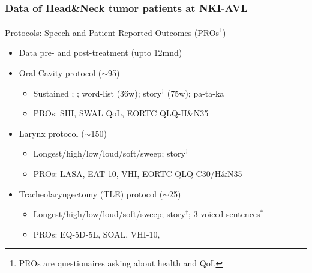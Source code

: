 \documentclass[xcolor=dvipsnames]{beamer}
\begin{document}
\begin{frame}
	\frametitle{Data of Head\&Neck tumor patients at NKI-AVL}
	
	\begin{block}{Protocols: Speech and Patient Reported Outcomes (PROs\footnote[frame]{PROs are questionaires asking about health and QoL})}
	\begin{itemize}
	\item Data pre- and post-treatment (upto 12mnd)
	\item Oral Cavity protocol ($\sim$95)
		\begin{itemize}
		\item Sustained ; ;  word-list (36w); story$^\dagger$ (75w); pa-ta-ka 
		\item PROs: SHI, SWAL QoL, EORTC QLQ-H\&N35
		\end{itemize}
	\item Larynx protocol ($\sim$150)
		\begin{itemize}
		\item {} Longest/high/low/loud/soft/sweep; story$^\dagger$
		\item PROs: LASA, EAT-10, VHI, EORTC QLQ-C30/H\&N35
		\end{itemize}
	\item Tracheolaryngectomy (TLE) protocol ($\sim$25)
		\begin{itemize}
		\item {} Longest/high/low/loud/soft/sweep; story$^\dagger$; 3 voiced sentences$^*$
		\item PROs: EQ-5D-5L, SOAL, VHI-10, 
		\end{itemize}
	\end{itemize}
	\end{block}	
	
\end{frame}
\end{document}
